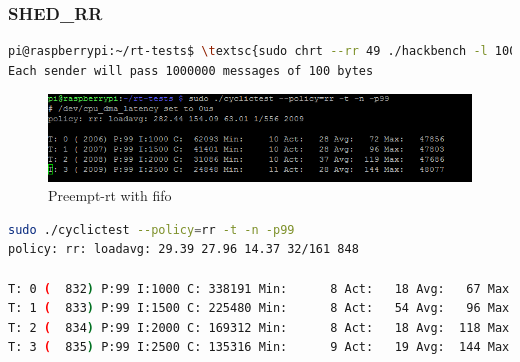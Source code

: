 \documentclass[10pt,a4paper]{article}
\begin{document}
\subsubsection{SHED\_RR}
\begin{lstlisting}[language=bash,caption={Hackbench with shed\_rr and priority 49}]
pi@raspberrypi:~/rt-tests$ \textsc{sudo chrt --rr 49 ./hackbench -l 1000000 -g 1q                     }
Each sender will pass 1000000 messages of 100 bytes
\end{lstlisting}
\begin{figure}[H]
\includegraphics[width=16cm]{Preempt-RR-WithHackbench.png}
\caption{Preempt-rt with fifo}
\end{figure}
\begin{lstlisting}[language=bash,caption={Volontary kernel}]
sudo ./cyclictest --policy=rr -t -n -p99
policy: rr: loadavg: 29.39 27.96 14.37 32/161 848          

T: 0 (  832) P:99 I:1000 C: 338191 Min:      8 Act:   18 Avg:   67 Max:   49660
T: 1 (  833) P:99 I:1500 C: 225480 Min:      8 Act:   54 Avg:   96 Max:   49563
T: 2 (  834) P:99 I:2000 C: 169312 Min:      8 Act:   18 Avg:  118 Max:   49511
T: 3 (  835) P:99 I:2500 C: 135316 Min:      9 Act:   19 Avg:  144 Max:   47964
\end{lstlisting}
\end{document}
